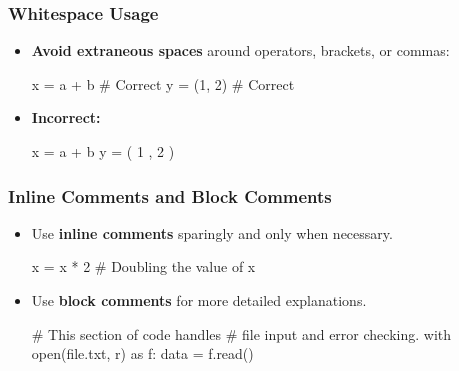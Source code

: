 \documentclass[
  letterpaper,
  DIV=11,
  numbers=noendperiod]{scrreprt}
\newenvironment{Shaded}{\begin{snugshade}}{\end{snugshade}}
\newcommand{\BuiltInTok}[1]{\textcolor[rgb]{0.00,0.23,0.31}{#1}}
\newcommand{\CommentTok}[1]{\textcolor[rgb]{0.37,0.37,0.37}{#1}}
\newcommand{\ControlFlowTok}[1]{\textcolor[rgb]{0.00,0.23,0.31}{#1}}
\newcommand{\DecValTok}[1]{\textcolor[rgb]{0.68,0.00,0.00}{#1}}
\newcommand{\ImportTok}[1]{\textcolor[rgb]{0.00,0.46,0.62}{#1}}
\newcommand{\NormalTok}[1]{\textcolor[rgb]{0.00,0.23,0.31}{#1}}
\newcommand{\OperatorTok}[1]{\textcolor[rgb]{0.37,0.37,0.37}{#1}}
\newcommand{\StringTok}[1]{\textcolor[rgb]{0.13,0.47,0.30}{#1}}
\begin{document}
\hypertarget{whitespace-usage}{%
\subsubsection{Whitespace Usage}\label{whitespace-usage}}

\begin{itemize}
\item
  \textbf{Avoid extraneous spaces} around operators, brackets, or
  commas:

\begin{Shaded}
\begin{Highlighting}[]
\NormalTok{x }\OperatorTok{=}\NormalTok{ a }\OperatorTok{+}\NormalTok{ b  }\CommentTok{\# Correct}
\NormalTok{y }\OperatorTok{=}\NormalTok{ (}\DecValTok{1}\NormalTok{, }\DecValTok{2}\NormalTok{)  }\CommentTok{\# Correct}
\end{Highlighting}
\end{Shaded}
\item
  \textbf{Incorrect:}

\begin{Shaded}
\begin{Highlighting}[]
\NormalTok{x }\OperatorTok{=}\NormalTok{ a  }\OperatorTok{+}\NormalTok{  b}
\NormalTok{y }\OperatorTok{=}\NormalTok{ ( }\DecValTok{1}\NormalTok{ , }\DecValTok{2}\NormalTok{ )}
\end{Highlighting}
\end{Shaded}
\end{itemize}

\hypertarget{inline-comments-and-block-comments}{%
\subsubsection{Inline Comments and Block
Comments}\label{inline-comments-and-block-comments}}

\begin{itemize}
\item
  Use \textbf{inline comments} sparingly and only when necessary.

\begin{Shaded}
\begin{Highlighting}[]
\NormalTok{x }\OperatorTok{=}\NormalTok{ x }\OperatorTok{*} \DecValTok{2}  \CommentTok{\# Doubling the value of x}
\end{Highlighting}
\end{Shaded}
\item
  Use \textbf{block comments} for more detailed explanations.

\begin{Shaded}
\begin{Highlighting}[]
\CommentTok{\# This section of code handles}
\CommentTok{\# file input and error checking.}
\ControlFlowTok{with} \BuiltInTok{open}\NormalTok{(}\StringTok{\textquotesingle{}file.txt\textquotesingle{}}\NormalTok{, }\StringTok{\textquotesingle{}r\textquotesingle{}}\NormalTok{) }\ImportTok{as}\NormalTok{ f:}
\NormalTok{    data }\OperatorTok{=}\NormalTok{ f.read()}
\end{Highlighting}
\end{Shaded}
\end{itemize}
\end{document}
